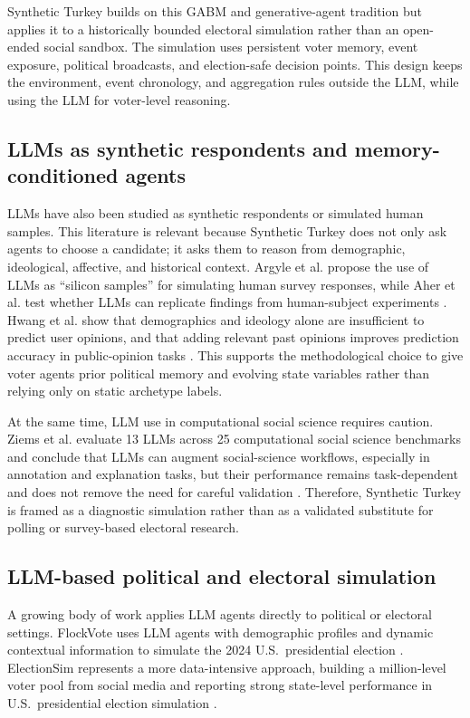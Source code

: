 \documentclass[pdflatex,sn-mathphys-num,iicol]{sn-jnl}
\begin{document}
Synthetic Turkey builds on this GABM and generative-agent tradition but applies
it to a historically bounded electoral simulation rather than an open-ended
social sandbox. The simulation uses persistent voter memory, event exposure,
political broadcasts, and election-safe decision points. This design keeps the
environment, event chronology, and aggregation rules outside the LLM, while
using the LLM for voter-level reasoning.

\subsection{LLMs as synthetic respondents and memory-conditioned
agents}\label{subsec:synthetic-respondents}

LLMs have also been studied as synthetic respondents or simulated human
samples. This literature is relevant because Synthetic Turkey does not only ask
agents to choose a candidate; it asks them to reason from demographic,
ideological, affective, and historical context. Argyle et al. propose the use
of LLMs as ``silicon samples'' for simulating human survey responses, while
Aher et al. test whether LLMs can replicate findings from human-subject
experiments \cite{argyle2023out,aher2023simulating}. Hwang et al. show that
demographics and ideology alone are insufficient to predict user opinions, and
that adding relevant past opinions improves prediction accuracy in
public-opinion tasks \cite{hwang2023aligning}. This supports the
methodological choice to give voter agents prior political memory and evolving
state variables rather than relying only on static archetype labels.

At the same time, LLM use in computational social science requires caution.
Ziems et al. evaluate 13 LLMs across 25 computational social science benchmarks
and conclude that LLMs can augment social-science workflows, especially in
annotation and explanation tasks, but their performance remains task-dependent
and does not remove the need for careful validation \cite{ziems2024css}.
Therefore, Synthetic Turkey is framed as a diagnostic simulation rather than
as a validated substitute for polling or survey-based electoral research.

\subsection{LLM-based political and electoral simulation}\label{subsec:electoral-sim}

A growing body of work applies LLM agents directly to political or electoral
settings. FlockVote uses LLM agents with demographic profiles and dynamic
contextual information to simulate the 2024 U.S.\ presidential election
\cite{zhou2025flockvote}. ElectionSim represents a more data-intensive
approach, building a million-level voter pool from social media and reporting
strong state-level performance in U.S.\ presidential election simulation
\cite{zhang2024electionsim}.
\end{document}
